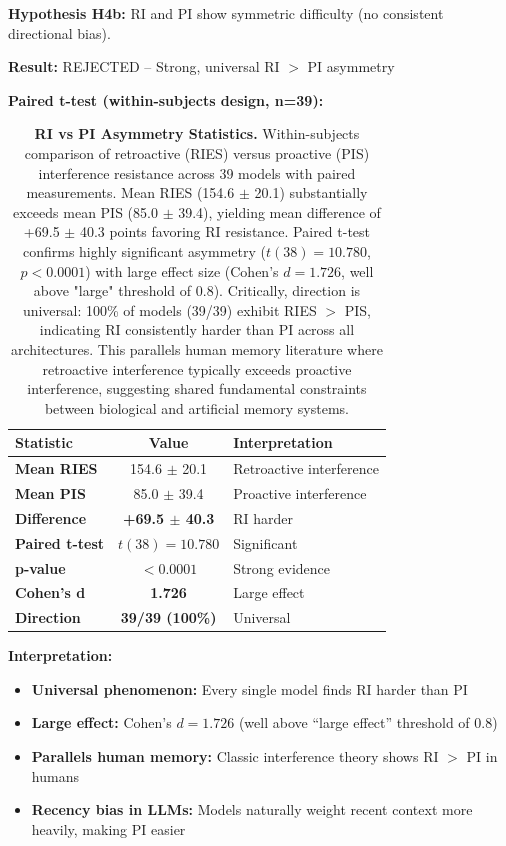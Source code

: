 \documentclass{article}
\begin{document}
\textbf{Hypothesis H4b:} RI and PI show symmetric difficulty (no consistent directional bias).

\textbf{Result:} REJECTED -- Strong, universal RI $>$ PI asymmetry

\textbf{Paired t-test (within-subjects design, n=39):}

\begin{table}[t]
\centering
\small
\caption{\textbf{RI vs PI Asymmetry Statistics.}
Within-subjects comparison of retroactive (RIES) versus proactive (PIS) interference resistance across 39 models with paired measurements.
Mean RIES (154.6 $\pm$ 20.1) substantially exceeds mean PIS (85.0 $\pm$ 39.4), yielding mean difference of +69.5 $\pm$ 40.3 points favoring RI resistance.
Paired t-test confirms highly significant asymmetry ($t(38) = 10.780$, $p < 0.0001$) with large effect size (Cohen's $d = 1.726$, well above "large" threshold of 0.8).
Critically, direction is universal: 100\% of models (39/39) exhibit RIES $>$ PIS, indicating RI consistently harder than PI across all architectures.
This parallels human memory literature where retroactive interference typically exceeds proactive interference, suggesting shared fundamental constraints between biological and artificial memory systems.}
\setlength{\tabcolsep}{4pt}
\begin{tabular}{@{}lcp{3.2cm}@{}}
\toprule
Statistic & Value & Interpretation \\
\midrule
\textbf{Mean RIES} & 154.6 $\pm$ 20.1 & Retroactive interference \\
\textbf{Mean PIS} & 85.0 $\pm$ 39.4 & Proactive interference \\
\textbf{Difference} & \textbf{+69.5 $\pm$ 40.3} & RI harder \\
\textbf{Paired t-test} & $t(38) = 10.780$ & Significant \\
\textbf{p-value} & \textbf{$< 0.0001$} & Strong evidence \\
\textbf{Cohen's d} & \textbf{1.726} & Large effect \\
\textbf{Direction} & \textbf{39/39 (100\%)} & Universal \\
\bottomrule
\end{tabular}
\end{table}

\textbf{Interpretation:}
\begin{itemize}[itemsep=2pt,topsep=3pt,parsep=0pt]
    \item \textbf{Universal phenomenon:} Every single model finds RI harder than PI
    \item \textbf{Large effect:} Cohen's $d = 1.726$ (well above ``large effect'' threshold of 0.8)
    \item \textbf{Parallels human memory:} Classic interference theory shows RI $>$ PI in humans
    \item \textbf{Recency bias in LLMs:} Models naturally weight recent context more heavily, making PI easier
\end{itemize}
\end{document}
